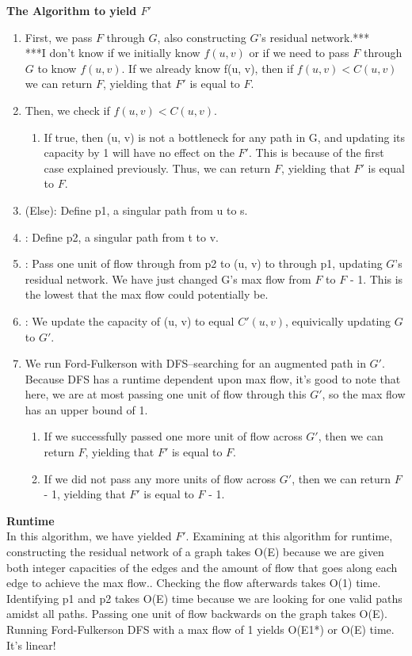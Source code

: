 \documentclass[11pt, solution, letterpaper]{format}
\begin{document}
\textbf{The Algorithm to yield $F'$}
\begin{enumerate}
\item First, we pass $F$ through $G$, also constructing $G$'s residual network.***\\
***I don't know if we initially know $f(u, v)$ or if we need to pass $F$ through $G$ to know $f(u, v)$. If we already know f(u, v), then if $f(u, v) < C(u, v)$ we can return $F$, yielding that $F'$ is equal to $F$.
\item Then, we check if $f(u, v) < C(u, v)$. 
\begin{enumerate}
\item If true, then (u, v) is not a bottleneck for any path in G, and updating its capacity by 1 will have no effect on the $F'$. This is because of the first case explained previously. Thus, we can return $F$, yielding that $F'$ is equal to $F$.
\end{enumerate}
\item (Else): Define p1, a singular path from u to s.
\item: Define p2, a singular path from t to v.
\item: Pass one unit of flow through from p2 to (u, v) to through p1, updating $G$'s residual network. We have just changed G's max flow from $F$ to $F$ - 1. This is the lowest that the max flow could potentially be. 
\item: We update the capacity of (u, v) to equal $C'(u, v)$, equivically updating $G$ to $G'$.
\item We run Ford-Fulkerson with DFS--searching for an augmented path in $G'$. Because DFS has a runtime dependent upon max flow, it's good to note that here, we are at most passing one unit of flow through this $G'$, so the max flow has an upper bound of 1.
\begin{enumerate}
\item If we successfully passed one more unit of flow across $G'$, then we can return $F$, yielding that $F'$ is equal to $F$.
\item If we did not pass any more units of flow across $G'$, then we can return $F$ - 1, yielding that $F'$ is equal to $F$ - 1.
\end{enumerate}
\end{enumerate}

\textbf{Runtime}\\
In this algorithm, we have yielded $F'$. Examining at this algorithm for runtime, constructing the residual network of a graph takes O(E) because we are given both integer capacities of the edges and the amount of flow that goes along each edge to achieve the max flow.. Checking the flow afterwards takes O(1) time. Identifying p1 and p2 takes O(E) time because we are looking for one valid paths amidst all paths. Passing one unit of flow backwards on the graph takes O(E).  Running Ford-Fulkerson DFS with a max flow of 1 yields O(E1*) or O(E) time. It's linear!
\end{document}
